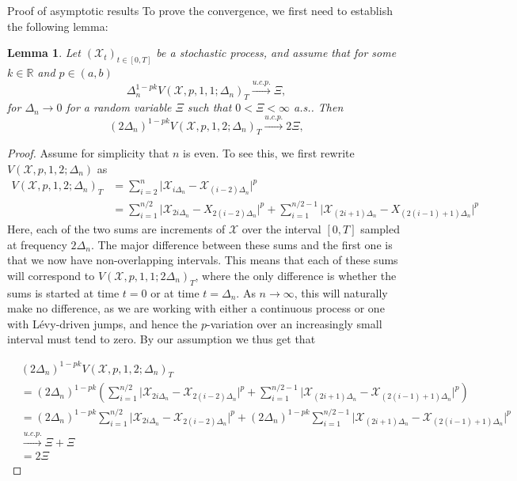 \documentclass[fleqn,11pt,letterpaper]{article}
\theoremstyle{plain}
\newtheorem{lemma}{Lemma}[section]
\theoremstyle{definition}
\theoremstyle{remark}
\numberwithin{equation}{section}
\begin{document}
\begin{section}{Proof of asymptotic results}
To prove the convergence, we first need to establish the following lemma:

\begin{lemma}
Let $(\mathcal{X}_t)_{t\in[0,T]}$ be a stochastic process, and assume that for some $k\in\mathbb{R}$ and $p\in(a,b)$ 
\begin{equation}
    \Delta_n^{1-pk}V(\mathcal{X},p,1,1;\Delta_n)_T\overset{u.c.p.}{\longrightarrow}\Xi,
\end{equation}
for $\Delta_n\to0$ for a random variable $\Xi$ such that $0<\Xi<\infty$ a.s.. Then 
\begin{equation}
    (2\Delta_n)^{1-pk}V(\mathcal{X},p,1,2;\Delta_n)_T\overset{u.c.p.}{\longrightarrow}2\Xi,
\end{equation}
\end{lemma}
\begin{proof}
Assume for simplicity that $n$ is even. To see this, we first rewrite $V(\mathcal{X},p,1,2;\Delta_n)$ as 
\begin{equation}
    \begin{split}
        V(\mathcal{X},p,1,2;\Delta_n)_T &= \sum_{i=2}^n\vert \mathcal{X}_{i\Delta_n}-\mathcal{X}_{(i-2)\Delta_n}\vert^p \\
        &= \sum_{i=1}^{n/2}\vert \mathcal{X}_{2i\Delta_n}-X_{2(i-2)\Delta_n}\vert^p + \sum_{i=1}^{n/2-1}\vert \mathcal{X}_{(2i+1)\Delta_n}-X_{(2(i-1)+1)\Delta_n}\vert^p
    \end{split}
\end{equation}
Here, each of the two sums are increments of $\mathcal{X}$ over the interval $[0,T]$ sampled at frequency $2\Delta_n$. The major difference between these sums and the first one is that we now have non-overlapping intervals. This means that each of these sums will correspond to $V(\mathcal{X},p,1,1;2\Delta_n)_T$, where the only difference is whether the sums is started at time $t=0$ or at time $t=\Delta_n$. As $n\to\infty$, this will naturally make no difference, as we are working with either a continuous process or one with Lévy-driven jumps, and hence the $p$-variation over an increasingly small interval must tend to zero. By our assumption we thus get that 

\begin{equation}
    \begin{split}
        &(2\Delta_n)^{1-pk}V(\mathcal{X},p,1,2;\Delta_n)_T \\
        &= (2\Delta_n)^{1-pk}(\sum_{i=1}^{n/2}\vert \mathcal{X}_{2i\Delta_n}-\mathcal{X}_{2(i-2)\Delta_n}\vert^p + \sum_{i=1}^{n/2-1}\vert \mathcal{X}_{(2i+1)\Delta_n}-\mathcal{X}_{(2(i-1)+1)\Delta_n}\vert^p) \\
        &= (2\Delta_n)^{1-pk}\sum_{i=1}^{n/2}\vert \mathcal{X}_{2i\Delta_n}-\mathcal{X}_{2(i-2)\Delta_n}\vert^p + (2\Delta_n)^{1-pk}\sum_{i=1}^{n/2-1}\vert \mathcal{X}_{(2i+1)\Delta_n}-\mathcal{X}_{(2(i-1)+1)\Delta_n}\vert^p \\
        &\overset{u.c.p.}{\longrightarrow} \Xi + \Xi \\
        &= 2\Xi
    \end{split}
\end{equation}
\end{proof}


\end{section}
\end{document}
